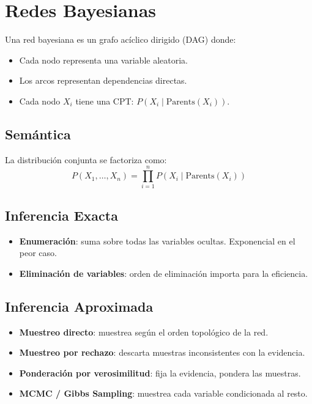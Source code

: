\section{Redes Bayesianas}

\begin{definition}
Una red bayesiana es un grafo acíclico dirigido (DAG) donde:
\begin{itemize}
    \item Cada nodo representa una variable aleatoria.
    \item Los arcos representan dependencias directas.
    \item Cada nodo $X_i$ tiene una CPT: $P(X_i \mid \text{Parents}(X_i))$.
\end{itemize}
\end{definition}

\subsection{Semántica}

La distribución conjunta se factoriza como:
$$P(X_1, \ldots, X_n) = \prod_{i=1}^{n} P(X_i \mid \text{Parents}(X_i))$$

\subsection{Inferencia Exacta}

\begin{itemize}
    \item \textbf{Enumeración}: suma sobre todas las variables ocultas. Exponencial en el peor caso.
    \item \textbf{Eliminación de variables}: orden de eliminación importa para la eficiencia.
\end{itemize}

\subsection{Inferencia Aproximada}

\begin{itemize}
    \item \textbf{Muestreo directo}: muestrea según el orden topológico de la red.
    \item \textbf{Muestreo por rechazo}: descarta muestras inconsistentes con la evidencia.
    \item \textbf{Ponderación por verosimilitud}: fija la evidencia, pondera las muestras.
    \item \textbf{MCMC / Gibbs Sampling}: muestrea cada variable condicionada al resto.
\end{itemize}

